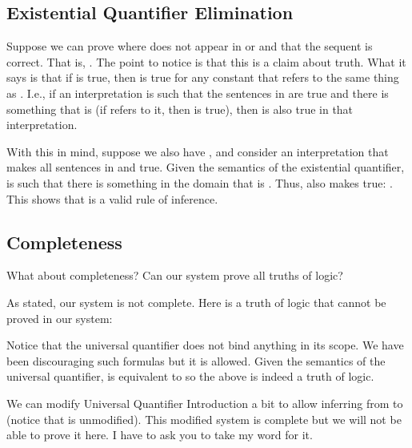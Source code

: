 \subsection{Existential Quantifier Elimination}

Suppose we can prove  where  does not appear 
in \p{\Delta} or \p{\psi} and that the sequent is correct. That is, . The point to notice is that this is a claim about 
truth.  What it says is that if  is true, then \p{\phi(\kappa)} is 
true for any constant \p{\kappa} that refers to the same thing as . I.e., 
if an interpretation is such that the sentences in \p{\Delta} are true and there 
is something that is \p{\phi} (if \p{\kappa} refers to it,  then \p{\phi(\kappa)} 
is true), then \p{\psi} is also true in that interpretation.

With this in mind, suppose we also have , and consider an interpretation  that makes all sentences in 
\p{\Gamma} and \p{\Delta} true. Given the semantics of the existential 
quantifier,  is such that there is something in the domain that 
is \p{\phi}. Thus,  also makes \p{\psi} true: \p{\Gamma,
\Delta \lentails \psi}. This shows that \exE{} is a valid rule of inference.


\subsection{Completeness}


What about completeness? Can our system prove all truths of logic?

As stated, our system is not complete. Here is a truth of logic that cannot be 
proved in our system:

\begin{center}


\end{center}

Notice that the universal quantifier does not bind anything in its scope. We 
have been discouraging such formulas but it is allowed. Given the semantics of 
the universal quantifier,  is equivalent to  so the above 
is indeed a truth of logic.

We can modify Universal Quantifier Introduction a bit to allow inferring from 
\p{\seq{\Lambda}{\phi}} to \p{\seq{\Lambda}{\lforall \upsilon \phi}} (notice 
that \p{\phi} is unmodified).  This modified system is complete but we will not 
be able to prove it here.  I have to ask you to take my word for it.
 
